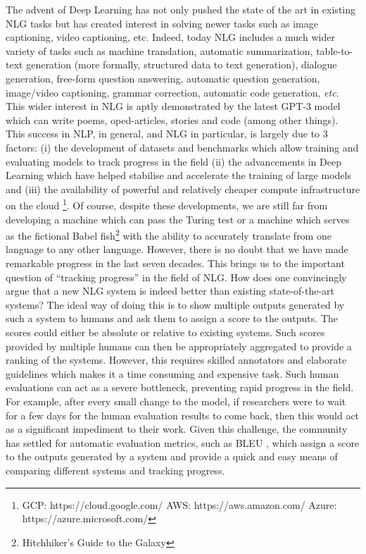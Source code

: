 The advent of Deep Learning has not only pushed the state of the art in existing NLG tasks but has created interest in solving newer tasks such as image captioning, video captioning, etc. Indeed, today NLG includes a much wider variety of tasks such as machine translation, automatic summarization, table-to-text generation (more formally, structured data to text generation), dialogue generation, free-form question answering, automatic question generation, image/video captioning, grammar correction, automatic code generation, \textit{etc}. This wider interest in NLG is aptly demonstrated by the latest GPT-3 model  which can write poems, oped-articles, stories and code (among other things). This success in NLP, in general, and NLG in particular, is largely due to 3 factors: (i) the development of datasets and benchmarks which allow training and evaluating models to track progress in the field (ii) the advancements in Deep Learning which have helped stabilise and accelerate the training of large models and (iii) the availability of powerful and relatively cheaper compute infrastructure on the cloud \footnote{GCP: https://cloud.google.com/ AWS: https://aws.amazon.com/ Azure: https://azure.microsoft.com/}. Of course, despite these developments, we are still far from developing a machine which can pass the Turing test or a machine which serves as the fictional Babel fish\footnote{Hitchhiker's Guide to the Galaxy} with the ability to accurately translate from one language to any other language. However, there is no doubt that we have made remarkable progress in the last seven decades. 
This brings us to the important question of ``tracking progress'' in the field of NLG. How does one convincingly argue that a new NLG system is indeed better than existing state-of-the-art systems? The ideal way of doing this is to show multiple outputs generated by such a system to humans and ask them to assign a score to the outputs. The scores could either be absolute or relative to existing systems. Such scores provided by multiple humans can then be appropriately aggregated to provide a ranking of the systems. However, this requires skilled annotators and elaborate guidelines which makes it a time consuming and expensive task. Such human evaluations can act as a severe bottleneck, preventing rapid progress in the field. For example, after every small change to the model, if researchers were to wait for a few days for the human evaluation results to come back, then this would act as a significant impediment to their work. Given this challenge, the community has settled for automatic evaluation metrics, such as BLEU , which assign a score to the outputs generated by a system and provide a quick and easy means of comparing different systems and tracking progress. 
